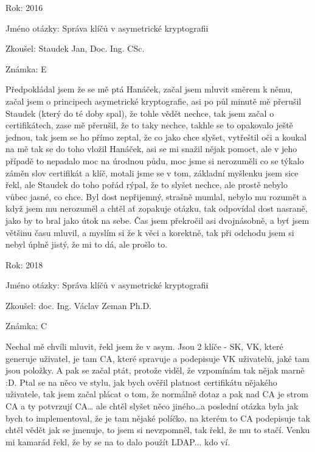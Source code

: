 \begin{compactitem}
    \item Rok: 2016
    \item Jméno otázky: Správa klíčů v asymetrické kryptografii
    \item Zkoušel: Staudek Jan, Doc. Ing. CSc.
    \item Známka: E
    \item Předpokládal jsem že se mě ptá Hanáček, začal jsem mluvit směrem k němu, začal jsem o principech asymetrické kryptografie, asi po půl minutě mě přerušil Staudek (který do té doby spal), že tohle vědět nechce, tak jsem začal o certifikátech, zase mě přerušil, že to taky nechce, takhle se to opakovalo ještě jednou, tak jsem se ho přímo zeptal, že co jako chce slyšet, vytřeštil oči a koukal na mě tak se do toho vložil Hanáček, asi se mi snažil nějak pomoct, ale v jeho případě to nepadalo moc na úrodnou půdu, moc jsme si nerozuměli co se týkalo záměn slov certifikát a klíč, motali jsme se v tom, základní myšlenku jsem sice řekl, ale Staudek do toho pořád rýpal, že to slyšet nechce, ale prostě nebylo vůbec jasné, co chce. Byl dost nepřijemný, strašně mumlal, nebylo mu rozumět a když jsem mu nerozuměl a chtěl ať zopakuje otázku, tak odpovídal dost nasraně, jako by to bral jako útok na sebe. Čas jsem překročil asi dvojnásobně, a byť jsem většinu času mluvil, a myslím si že k věci a korektně, tak při odchodu jsem si nebyl úplně jistý, že mi to dá, ale prošlo to.
\end{compactitem}

\begin{compactitem}
    \item Rok: 2018
    \item Jméno otázky: Správa klíčů v asymetrické kryptografii
    \item Zkoušel: doc. Ing. Václav Zeman Ph.D.
    \item Známka: C
    \item Nechal mě chvíli mluvit, řekl jsem že v asym. Jsou 2 klíče - SK, VK, které generuje uživatel, je tam CA, které spravuje a podepisuje VK uživatelů, jaké tam jsou položky. A pak se začal ptát, protože viděl, že vzpomínám tak nějak marně :D. Ptal se na něco ve stylu, jak bych ověřil platnost certifikátu nějakého uživatele, tak jsem začal plácat o tom, že normálně dotaz a pak nad CA je strom CA a ty potvrzují CA… ale chtěl slyšet něco jiného…a poslední otázka byla jak bych to implementoval, že je tam nějaké políčko, na kterém to CA podepisuje tak chtěl vědět jak se jmenuje, to jsem si nevzpomněl, tak řekl, že mu to stačí. Venku mi kamarád řekl, že by se na to dalo použít LDAP... kdo ví.
\end{compactitem}

